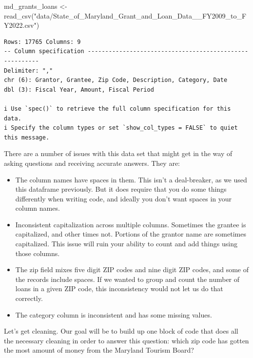 \documentclass[
  letterpaper,
  DIV=11,
  numbers=noendperiod]{scrreprt}
\newenvironment{Shaded}{\begin{snugshade}}{\end{snugshade}}
\newcommand{\FunctionTok}[1]{\textcolor[rgb]{0.28,0.35,0.67}{#1}}
\newcommand{\NormalTok}[1]{\textcolor[rgb]{0.00,0.23,0.31}{#1}}
\newcommand{\OtherTok}[1]{\textcolor[rgb]{0.00,0.23,0.31}{#1}}
\newcommand{\StringTok}[1]{\textcolor[rgb]{0.13,0.47,0.30}{#1}}
\providecommand{\tightlist}{%
  \setlength{\itemsep}{0pt}\setlength{\parskip}{0pt}}\usepackage{longtable,booktabs,array}
\begin{document}
\begin{Shaded}
\begin{Highlighting}[]
\NormalTok{md\_grants\_loans }\OtherTok{\textless{}{-}} \FunctionTok{read\_csv}\NormalTok{(}\StringTok{"data/State\_of\_Maryland\_Grant\_and\_Loan\_Data\_\_FY2009\_to\_FY2022.csv"}\NormalTok{)}
\end{Highlighting}
\end{Shaded}

\begin{verbatim}
Rows: 17765 Columns: 9
-- Column specification --------------------------------------------------------
Delimiter: ","
chr (6): Grantor, Grantee, Zip Code, Description, Category, Date
dbl (3): Fiscal Year, Amount, Fiscal Period

i Use `spec()` to retrieve the full column specification for this data.
i Specify the column types or set `show_col_types = FALSE` to quiet this message.
\end{verbatim}

There are a number of issues with this data set that might get in the
way of asking questions and receiving accurate answers. They are:

\begin{itemize}
\tightlist
\item
  The column names have spaces in them. This isn't a deal-breaker, as we
  used this dataframe previously. But it does require that you do some
  things differently when writing code, and ideally you don't want
  spaces in your column names.
\item
  Inconsistent capitalization across multiple columns. Sometimes the
  grantee is capitalized, and other times not. Portions of the grantor
  name are sometimes capitalized. This issue will ruin your ability to
  count and add things using those columns.
\item
  The zip field mixes five digit ZIP codes and nine digit ZIP codes, and
  some of the records include spaces. If we wanted to group and count
  the number of loans in a given ZIP code, this inconsistency would not
  let us do that correctly.
\item
  The category column is inconsistent and has some missing values.
\end{itemize}

Let's get cleaning. Our goal will be to build up one block of code that
does all the necessary cleaning in order to answer this question: which
zip code has gotten the most amount of money from the Maryland Tourism
Board?
\end{document}
